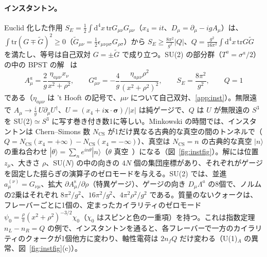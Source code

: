 \documentclass[a4paper,10pt]{ltjsarticle}
\newcommand{\dd}{\mathrm{d}}
\newcommand{\tr}{\mathrm{tr}}
\begin{document}
\paragraph{インスタントン。}Euclid 化した作用 $S_E=\frac12\int\dd^4x\,\tr G_{\mu\nu}G_{\mu\nu}$（$x_4=it$、$D_\mu=\partial_\mu-igA_\mu$）は、$\int\tr(G\mp\tilde G)^2\ge0$（$\tilde G_{\mu\nu}=\frac12\epsilon_{\mu\nu\rho\sigma}G_{\rho\sigma}$）から $S_E\ge\frac{8\pi^2}{g^2}|Q|$、$Q=\frac{g^2}{16\pi^2}\int\dd^4x\,\tr G\tilde G$ を満たし、等号は自己双対 $G=\pm\tilde G$ で成り立つ。SU(2) の部分群（$T^a=\sigma^a/2$）の中の BPST の解~\cite{bpst} は
\begin{equation}
A^a_\mu=\frac2g\frac{\eta_{a\mu\nu}x_\nu}{x^2+\rho^2},\qquad G^a_{\mu\nu}=-\frac4g\frac{\eta_{a\mu\nu}\rho^2}{(x^2+\rho^2)^2},\qquad S_E=\frac{8\pi^2}{g^2},\qquad Q=1
\label{eq:bpst}
\end{equation}
である（$\eta_{a\mu\nu}$ は 't Hooft の記号で、$\mu\nu$ について自己双対、\ref{app:inst}）。無限遠で $A_\mu\to\frac ig\,U\partial_\mu U^\dagger$、$U=(x_4+i\boldsymbol x\cdot\boldsymbol\sigma)/|x|$ は純ゲージで、$Q$ は $U$ が無限遠の $S^3$ を SU(2)$\simeq S^3$ に写す巻き付き数1に等しい。Minkowski の時間では、インスタントンは Chern--Simons 数 $N_{\mathrm{CS}}$ が1だけ異なる古典的な真空の間のトンネルで（$Q=N_{\mathrm{CS}}(x_4=+\infty)-N_{\mathrm{CS}}(x_4=-\infty)$）、真空は $N_{\mathrm{CS}}=n$ の古典的な真空 $|n\rangle$ の重ね合わせ $|\theta\rangle=\sum_ne^{in\theta}|n\rangle$（$\theta$ 真空~\cite{cdg76,jr76}）になる（図~\ref{fig:instfig}）。解には位置 $z_\mu$、大きさ $\rho$、SU($N$) の中の向きの $4N$ 個の集団座標があり、それぞれがゲージを固定した揺らぎの演算子のゼロモードを与える。SU(2) では、並進 $a^{(\nu)}_\mu=G_{\nu\mu}$、拡大 $\partial A^{\mathrm s}_\mu/\partial\rho$（特異ゲージ）、ゲージの向き $D_\mu\Lambda^a$ の8個で、ノルムの2乗はそれぞれ $8\pi^2/g^2$、$16\pi^2/g^2$、$4\pi^2\rho^2/g^2$ である。質量のないクォークは、フレーバーごとに1個の、定まったカイラリティのゼロモード $\psi_0=\frac\rho\pi(x^2+\rho^2)^{-3/2}\chi_0$（$\chi_0$ はスピンと色の一重項）を持つ。これは指数定理 $n_L-n_R=Q$ の例で、インスタントンを通ると、各フレーバーで一方のカイラリティのクォークが1個他方に変わり、軸性電荷は $2n_fQ$ だけ変わる（U(1)$_A$ の異常、図~\ref{fig:instfig}(c)）。
\end{document}
